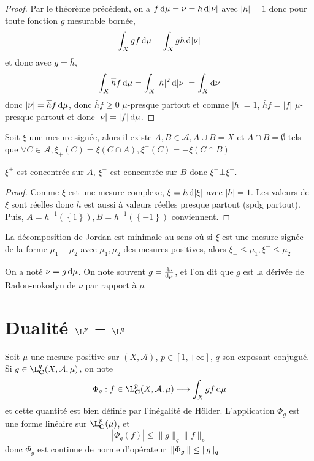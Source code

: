 \begin{proof}
Par le théorème précédent, on a $f\mathop{}\!\mathrm d \mu=\nu=h\mathop{}\!\mathrm d |\nu|$ avec $|h|=1$ donc pour toute fonction $g$ mesurable bornée, \[
\int_X gf\mathop{}\!\mathrm d\mu = \int_X gh\mathop{}\!\mathrm d |\nu|
\] 
et donc avec $g= \bar{h}$, \[
\int_X \overline{h}f\mathop{}\!\mathrm d\mu=\int_X |h|^2 \mathop{}\!\mathrm d |\nu|=\int_X \mathop{}\!\mathrm d \nu
\]
donc $|\nu|=\overline{h} f\mathop{}\!\mathrm d\mu$, donc $\bar{h} f\geq 0$ $\mu$-presque partout et comme  $|h|=1$,  $\bar{h}f=|f|$ $\mu$-presque partout et donc  $|\nu|=|f|\mathop{}\!\mathrm d \mu$.
\end{proof}

\begin{thm}
    Soit $\xi$ une mesure signée, alors il existe  $A, B \in  \mathcal  A, A\cup B=X$ et $A\cap B=\emptyset$ tels que  $\forall  C \in  \mathcal  A, \xi_+(C)=\xi(C\cap A), \xi^-(C)=-\xi(C\cap B)$
\end{thm}

\begin{rem}
$\xi^+$ est concentrée sur  $A$,  $\xi^-$ est concentrée sur  $B$ donc  $\xi^+\bot \xi^-$.
\end{rem}

\begin{proof}
    Comme $\xi$ est une mesure complexe,  $\xi=h\mathop{}\!\mathrm d |\xi|$ avec  $|h|=1$.  Les valeurs de $\xi$ sont réelles donc  $h$ est aussi à valeurs réelles presque partout (spdg partout). Puis, $A = h^{-1}(\left\{ 1 \right\} ), B = h^{-1}(\left\{ -1 \right\} )$ conviennent.
\end{proof}

\begin{prop}
La décomposition de Jordan est minimale au sens où si $\xi$ est une mesure signée de la forme  $\mu_1-\mu_2$ avec  $\mu_1, \mu_2$ des mesures positives, alors  $\xi_+\leq \mu_1, \xi^-\leq \mu_2$
\end{prop}

\begin{rem}
    On a noté $\nu = g\mathop{}\!\mathrm d \mu$. On note souvent  $g=\frac{\mathop{}\!\mathrm d \nu}{\mathop{}\!\mathrm d \mu}$, et l'on dit que  $g$ est la dérivée de Radon-nokodyn de  $\nu$ par rapport à  $\mu$
\end{rem}

\section{Dualité \texorpdfstring{$\L^p$ -- $\L^q$}{L^p - L^q}}

Soit $\mu$ une mesure positive sur  $(X, \mathcal  A)$, $p \in  [1, +\infty]$, $q$ son exposant conjugué. Si  $g \in  \L^q_{\C}(X, \mathcal  A, \mu)$, on note \[
    \Phi_g:f \in  \L^p_{\C}(X, \mathcal  A, \mu)\longmapsto \int_X gf\diff\mu
\] 
et cette quantité est bien définie par l'inégalité de Hölder. L'application $\Phi_g$ est une forme linéaire sur  $\L^p_{\C}(\mu)$, et \[
    |\Phi_g(f)|\leq \|g\|_q \|f\|_p
\] 
donc $\Phi_g$ est continue de norme d'opérateur  $\|\hspace{-1pt}|\Phi_g\|\hspace{-1pt}|\leq \|g\|_q$

